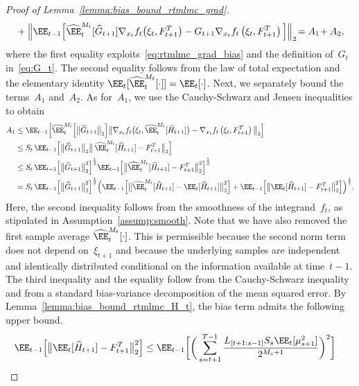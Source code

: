 \documentclass[11pt]{article}
\let\hat\widehat
\begin{document}
\begin{proof}[Proof of Lemma~\ref{lemma:bias_bound_rtmlmc_grad}]
\begin{equation}
\begin{aligned}
        &\quad + \Big\|\EE_{t-1}\Big[\hat\EE_t^{M_t}[\hat{G}_{t+1}]\nabla_{x_t} f_t \big(\xi_t,F_{t+1}^T\big) - G_{t+1}  \nabla_{x_t} f_t \left(\xi_t,F_{t+1}^T\right) \Big]\Big\|_2 \! = A_1 \! + A_2,
\end{aligned}
\end{equation}
where the first equality exploits~\eqref{eq:rtmlmc_grad_bias} and the definition of~$G_t$ in~\eqref{eq:G_t}. The second equality follows from the law of total expectation and the elementary identity $\EE_{t}[\hat\EE_t^{M_t}[\cdot]]=\EE_t[\cdot]$. Next, we separately bound the terms~$A_1$ and~$A_2$. As for~$A_1$, we use the Cauchy-Schwarz and Jensen inequalities to obtain
\begin{align*}
        A_1 & \leq \EE_{t-1}\Big[\hat\EE_t^{M_t}\Big[\big\|\hat{G}_{t+1}\big\|_2\Big] \big\|\nabla_{x_t} f_t \big(\xi_t,\hat\EE_t^{M_t}[\hat{H}_{t+1}] \big) -\nabla_{x_t} f_t \left(\xi_t,F_{t+1}^T\right)\big\|_2 \Big] \\
        & \leq S_t \, \EE_{t-1}\Big[\big\|\hat{G}_{t+1}\big\|_2 \big\| \, \hat\EE_t^{M_t}[\hat{H}_{t+1}]  - F_{t+1}^T \big\|_2 \Big] \\
        & \leq S_t \, \EE_{t-1}\Big[\big\|\hat{G}_{t+1}\big\|_2^2\Big]^\frac{1}{2} \EE_{t-1}\Big[\big\|\hat\EE_t^{M_t}[\hat{H}_{t+1}]  - F_{t+1}^T \big\|_2^2 \Big]^\frac{1}{2} \\
        & = S_t \, \EE_{t-1}\Big[\big\|\hat{G}_{t+1}\big\|_2^2\Big]^\frac{1}{2}\Big( \EE_{t-1}\Big[\big\|\hat\EE_t^{M_t}[\hat{H}_{t+1}]  - \EE_t[\hat{H}_{t+1}] \big\|_2^2 \Big] 
        +\EE_{t-1}\Big[\big\|\EE_t[\hat{H}_{t+1}] - F_{t+1}^T\big\|_2^2 \Big]\Big)^\frac{1}{2}.
\end{align*}
Here, the second inequality follows from the smoothness of the integrand~$f_t$, as stipulated in Assumption~\ref{assump:smooth}. Note that we have also removed the first sample average $\hat\EE_t^{M_t}[\cdot]$. This is permissible because the second norm term does not depend on~$\xi_{t+1}$ and because the underlying samples are independent and identically distributed conditional on the information available at time~$t-1$. The third inequality and the equality follow from the Cauchy-Schwarz inequality and from a standard bias-variance decomposition of the mean squared error. 
By Lemma~\ref{lemma:bias_bound_rtmlmc_H_t}, the bias term admits the following upper bound.
\begin{align*}
    &\EE_{t-1}\Big[\big\|\EE_t[\hat{H}_{t+1}] - F_{t+1}^T\big\|_2^2 \Big] \leq \EE_{t-1}\bigg[\bigg(\sum_{s=t+1}^{T-1} \frac{L_{[t+1:s-1]} S_s \EE_{t}[\mu_{s+1}^2]}{2^{M_s + 1}} \bigg)^2\bigg]

\end{align*}
\end{proof}
\end{document}
